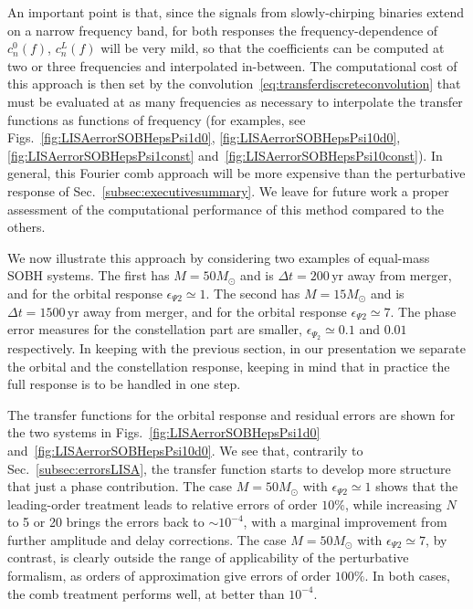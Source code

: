 \documentclass[aps,showpacs,twocolumn,
prd,superscriptaddress,nofootinbib]{revtex4-1}
\newcommand{\yr}{\,\mathrm{yr}}
\newcommand{\Msol}{M_{\odot}}
\begin{document}
An important point is that, since the signals from slowly-chirping binaries extend on a narrow frequency band, for both responses the frequency-dependence of $c_{n}^{0}(f)$, $c_{n}^{L}(f)$ will be very mild, so that the coefficients can be computed at two or three frequencies and interpolated in-between. The computational cost of this approach is then set by the convolution~\eqref{eq:transferdiscreteconvolution} that must be evaluated at as many frequencies as necessary to interpolate the transfer functions as functions of frequency (for examples, see Figs.~\ref{fig:LISAerrorSOBHepsPsi1d0}, \ref{fig:LISAerrorSOBHepsPsi10d0}, \ref{fig:LISAerrorSOBHepsPsi1const} and~\ref{fig:LISAerrorSOBHepsPsi10const}). In general, this Fourier comb approach will be more expensive than the perturbative response of Sec.~\ref{subsec:executivesummary}. We leave for future work a proper assessment of the computational performance of this method compared to the others. 

We now illustrate this approach by considering two examples of equal-mass SOBH systems. The first has $M = 50\Msol$ and is $\Delta t = 200\yr$ away from merger, and for the orbital response $\epsilon_{\Psi 2} \simeq 1$. The second has $M = 15\Msol$ and is $\Delta t = 1500\yr$ away from merger, and for the orbital response $\epsilon_{\Psi 2} \simeq 7$. The phase error measures for the constellation part are smaller, $\epsilon_{\Psi_{2}} \simeq 0.1$ and $0.01$ respectively. In keeping with the previous section, in our presentation we separate the orbital and the constellation response, keeping in mind that in practice the full response is to be handled in one step.

The transfer functions for the orbital response and residual errors are shown for the two systems in Figs.~\ref{fig:LISAerrorSOBHepsPsi1d0} and~\ref{fig:LISAerrorSOBHepsPsi10d0}. We see that, contrarily to Sec.~\ref{subsec:errorsLISA}, the transfer function starts to develop more structure that just a phase contribution. The case $M=50\Msol$ with $\epsilon_{\Psi 2} \simeq 1$ shows that the leading-order treatment leads to relative errors of order $10\%$, while increasing $N$ to 5 or 20 brings the errors back to $\sim 10^{-4}$, with a marginal improvement from further amplitude and delay corrections. The case $M=50\Msol$ with $\epsilon_{\Psi 2} \simeq 7$, by contrast, is clearly outside the range of applicability of the perturbative formalism, as orders of approximation give errors of order $100\%$. In both cases, the comb treatment performs well, at better than $10^{-4}$.
\end{document}
